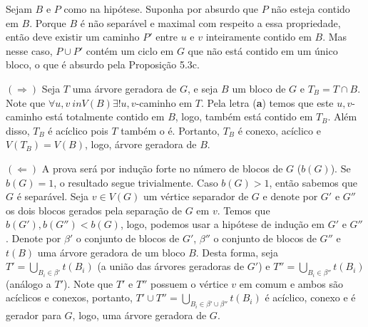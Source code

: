 
 Sejam $B$ e $P$ como na hipótese. Suponha por absurdo que $P$ não
esteja contido em $B$. Porque $B$ é não separável e maximal com respeito a essa
propriedade, então deve existir um caminho $P'$ entre $u$ e $v$ inteiramente
contido em $B$. Mas nesse caso, $P \cup P'$ contém um ciclo em $G$ que não está
contido em um único bloco, o que é absurdo pela Proposição 5.3c.
\fimprova

$(\Rightarrow)$ Seja $T$ uma árvore geradora de $G$, e seja $B$ um bloco de $G$
e $T_B = T \cap B$. Note que $\forall u,v \ in V(B) \exists! u,v$-caminho em $T$.
Pela letra ({\bf a}) temos que este $u,v$-caminho está totalmente contido em $B$,
logo, também está contido em $T_B$. Além disso, $T_B$ é acíclico pois $T$ também
o é. Portanto, $T_B$ é conexo, acíclico e $V(T_B) = V(B)$, logo, árvore geradora
de $B$.

$(\Leftarrow)$  A prova será por indução forte no número de blocos de $G$ 
($b(G)$). Se $b(G) = 1$, o resultado segue trivialmente. Caso $b(G) > 1$, então
sabemos que $G$ é separável. Seja $v \in V(G)$ um vértice separador de $G$ e
denote por $G'$ e $G''$ os dois blocos gerados pela separação de $G$ em $v$.
Temos que $b(G'),b(G'') < b(G)$, logo, podemos usar a hipótese de indução em 
$G'$ e $G''$. Denote por $\beta'$ o conjunto de blocos de $G'$, $\beta''$ o 
conjunto de blocos de $G''$ e $t(B)$ uma árvore geradora de um bloco $B$. 
Desta forma, seja $T' = \bigcup_{B_i \in \beta'} t(B_i)$ (a união
das árvores geradoras de $G'$) e $T'' = \bigcup_{B_i \in \beta''} t(B_i)$ (análogo
a $T'$). Note que $T'$ e $T''$ possuem o vértice $v$ em comum e ambos são
acíclicos e conexos, portanto, $T' \cup T'' = \bigcup_{B_i \in \beta' \cup \beta''} t(B_i)$
 é acíclico, conexo e é gerador para $G$, logo, uma árvore geradora de $G$.
\fimprova




